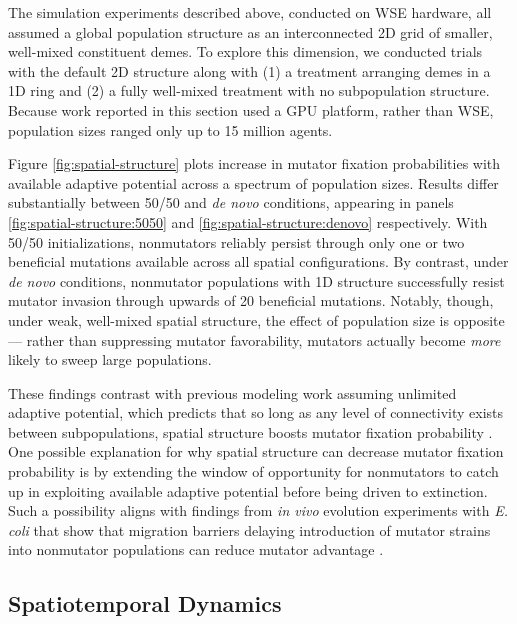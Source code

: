 The simulation experiments described above, conducted on WSE hardware, all assumed a global population structure as an interconnected 2D grid of smaller, well-mixed constituent demes.
To explore this dimension, we conducted trials with the default 2D structure along with (1) a treatment arranging demes in a 1D ring and (2) a fully well-mixed treatment with no subpopulation structure.
Because work reported in this section used a GPU platform, rather than WSE, population sizes ranged only up to 15 million agents.



Figure \ref{fig:spatial-structure} plots increase in mutator fixation probabilities with available adaptive potential across a spectrum of population sizes.
Results differ substantially between 50/50 and \textit{de novo} conditions, appearing in panels \ref{fig:spatial-structure:5050} and \ref{fig:spatial-structure:denovo} respectively.
With 50/50 initializations, nonmutators reliably persist through only one or two beneficial mutations available across all spatial configurations.
By contrast, under \textit{de novo} conditions, nonmutator populations with 1D structure successfully resist mutator invasion through upwards of 20 beneficial mutations.
Notably, though, under weak, well-mixed spatial structure, the effect of population size is opposite --- rather than suppressing mutator favorability, mutators actually become \textit{more} likely to sweep large populations.

These findings contrast with previous modeling work assuming unlimited adaptive potential, which predicts that so long as any level of connectivity exists between subpopulations, spatial structure boosts mutator fixation probability \citep{raynes2019migration}.
One possible explanation for why spatial structure can decrease mutator fixation probability is by extending the window of opportunity for nonmutators to catch up in exploiting available adaptive potential before being driven to extinction.
Such a possibility aligns with findings from \textit{in vivo} evolution experiments with \textit{E. coli} that show that migration barriers delaying introduction of mutator strains into nonmutator populations can reduce mutator advantage \citep{lechat2006escherichia}.

\subsection{Spatiotemporal Dynamics}
\label{sec:dynamics}

